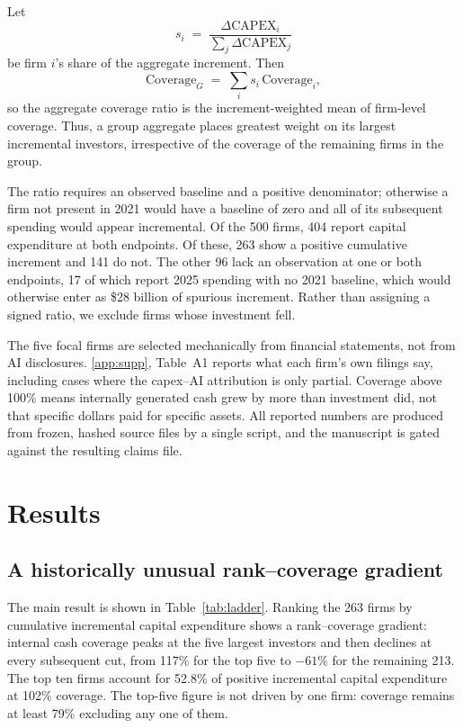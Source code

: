 \documentclass[preprint,11pt]{elsarticle}
\begin{document}
Let
\[
s_i \;=\; \frac{\Delta \mathrm{CAPEX}_i}{\sum_j \Delta \mathrm{CAPEX}_j}
\]
be firm $i$'s share of the aggregate increment. Then
\begin{equation}
\mathrm{Coverage}_G \;=\; \sum_i s_i\,\mathrm{Coverage}_i ,
\label{eq:agg}
\end{equation}
so the aggregate coverage ratio is the increment-weighted mean of firm-level coverage. Thus, a group
aggregate places greatest weight on its largest incremental investors, irrespective of the coverage
of the remaining firms in the group.

The ratio requires an observed baseline and a positive denominator; otherwise a firm not present in
2021 would have a baseline of zero and all of its subsequent spending would appear incremental. Of
the 500 firms, 404 report capital expenditure at both endpoints. Of these, 263 show a positive
cumulative increment and 141 do not. The other 96 lack an observation at one or both endpoints, 17
of which report 2025 spending with no 2021 baseline, which would otherwise enter as \$28 billion of
spurious increment. Rather than assigning a signed ratio, we exclude firms whose investment fell.

The five focal firms are selected mechanically from financial statements, not from AI disclosures.
\ref{app:supp}, Table~A1 reports what each firm's own filings say, including cases where the
capex--AI attribution is only partial. Coverage above 100\% means internally generated cash grew by
more than investment did, not that specific dollars paid for specific assets. All reported numbers
are produced from frozen, hashed source files by a single script, and the manuscript is gated
against the resulting claims file.

\section{Results}
\subsection{A historically unusual rank--coverage gradient}
The main result is shown in Table~\ref{tab:ladder}. Ranking the 263 firms by cumulative incremental
capital expenditure shows a rank--coverage gradient: internal cash coverage peaks at the five
largest investors and then declines at every subsequent cut, from 117\% for the top five to $-61$\%
for the remaining 213. The top ten firms account for 52.8\% of positive incremental capital
expenditure at 102\% coverage. The top-five figure is not driven by one firm: coverage remains at
least 79\% excluding any one of them.
\end{document}
